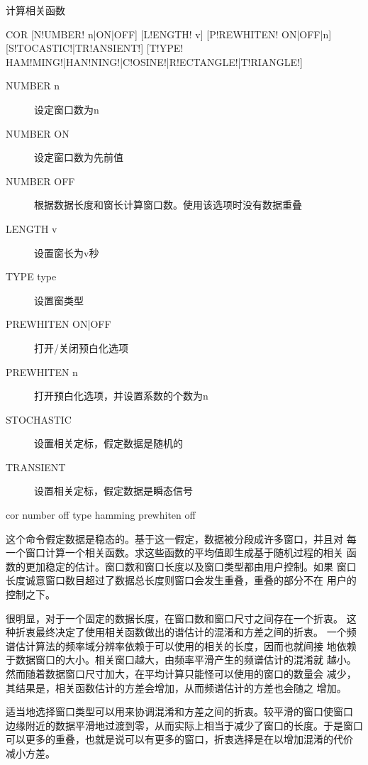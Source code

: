 \label{spe:cor}

计算相关函数

\begin{SACSTX}
COR [N!UMBER! n|ON|OFF] [L!ENGTH! v] [P!REWHITEN! ON|OFF|n] [S!TOCASTIC!|TR!ANSIENT!]
    [T!YPE! HAM!MING!|HAN!NING!|C!OSINE!|R!ECTANGLE!|T!RIANGLE!]
\end{SACSTX}

\begin{description}
\item [NUMBER n] 设定窗口数为n
\item [NUMBER ON] 设定窗口数为先前值
\item [NUMBER OFF] 根据数据长度和窗长计算窗口数。使用该选项时没有数据重叠
\item [LENGTH v] 设置窗长为v秒
\item [TYPE type] 设置窗类型
\item [PREWHITEN ON|OFF] 打开/关闭预白化选项
\item [PREWHITEN n] 打开预白化选项，并设置系数的个数为n
\item [STOCHASTIC] 设置相关定标，假定数据是随机的
\item [TRANSIENT] 设置相关定标，假定数据是瞬态信号
\end{description}

\begin{SACDFT}
cor number off type hamming prewhiten off
\end{SACDFT}

这个命令假定数据是稳态的。基于这一假定，数据被分段成许多窗口，并且对
每一个窗口计算一个相关函数。求这些函数的平均值即生成基于随机过程的相关
函数的更加稳定的估计。窗口数和窗口长度以及窗口类型都由用户控制。如果
窗口长度诚意窗口数目超过了数据总长度则窗口会发生重叠，重叠的部分不在
用户的控制之下。

很明显，对于一个固定的数据长度，在窗口数和窗口尺寸之间存在一个折衷。
这种折衷最终决定了使用相关函数做出的谱估计的混淆和方差之间的折衷。
一个频谱估计算法的频率域分辨率依赖于可以使用的相关的长度，因而也就间接
地依赖于数据窗口的大小。相关窗口越大，由频率平滑产生的频谱估计的混淆就
越小。然而随着数据窗口尺寸加大，在平均计算只能怪可以使用的窗口的数量会
减少，其结果是，相关函数估计的方差会增加，从而频谱估计的方差也会随之
增加。

适当地选择窗口类型可以用来协调混淆和方差之间的折衷。较平滑的窗口使窗口
边缘附近的数据平滑地过渡到零，从而实际上相当于减少了窗口的长度。于是窗口
可以更多的重叠，也就是说可以有更多的窗口，折衷选择是在以增加混淆的代价
减小方差。

